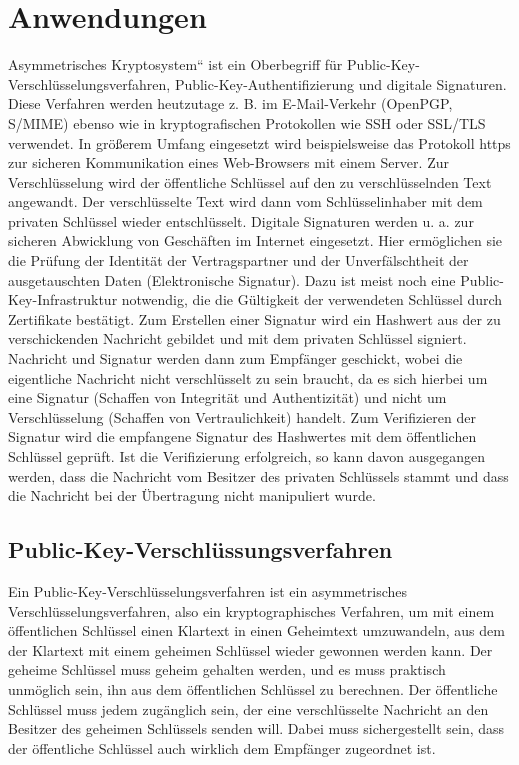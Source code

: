 \chapter{Anwendungen}
\label{chapter-anwendungen}
Asymmetrisches Kryptosystem“ ist ein Oberbegriff für Public-Key-Verschlüsselungsverfahren, Public-Key-Authentifizierung und digitale Signaturen. Diese Verfahren werden heutzutage z. B. im E-Mail-Verkehr (OpenPGP, S/MIME) ebenso wie in kryptografischen Protokollen wie SSH oder SSL/TLS verwendet. In größerem Umfang eingesetzt wird beispielsweise das Protokoll https zur sicheren Kommunikation eines Web-Browsers mit einem Server.
Zur Verschlüsselung wird der öffentliche Schlüssel auf den zu verschlüsselnden Text angewandt. Der verschlüsselte Text wird dann vom Schlüsselinhaber mit dem privaten Schlüssel wieder entschlüsselt.
Digitale Signaturen werden u. a. zur sicheren Abwicklung von Geschäften im Internet eingesetzt. Hier ermöglichen sie die Prüfung der Identität der Vertragspartner und der Unverfälschtheit der ausgetauschten Daten (Elektronische Signatur). Dazu ist meist noch eine Public-Key-Infrastruktur notwendig, die die Gültigkeit der verwendeten Schlüssel durch Zertifikate bestätigt.
Zum Erstellen einer Signatur wird ein Hashwert aus der zu verschickenden Nachricht gebildet und mit dem privaten Schlüssel signiert. Nachricht und Signatur werden dann zum Empfänger geschickt, wobei die eigentliche Nachricht nicht verschlüsselt zu sein braucht, da es sich hierbei um eine Signatur (Schaffen von Integrität und Authentizität) und nicht um Verschlüsselung (Schaffen von Vertraulichkeit) handelt.
Zum Verifizieren der Signatur wird die empfangene Signatur des Hashwertes mit dem öffentlichen Schlüssel geprüft. Ist die Verifizierung erfolgreich, so kann davon ausgegangen werden, dass die Nachricht vom Besitzer des privaten Schlüssels stammt und dass die Nachricht bei der Übertragung nicht manipuliert wurde.
\section{Public-Key-Verschlüssungsverfahren}
Ein Public-Key-Verschlüsselungsverfahren ist ein asymmetrisches Verschlüsselungsverfahren, also ein kryptographisches Verfahren, um mit einem öffentlichen Schlüssel einen Klartext in einen Geheimtext umzuwandeln, aus dem der Klartext mit einem geheimen Schlüssel wieder gewonnen werden kann.
Der geheime Schlüssel muss geheim gehalten werden, und es muss praktisch unmöglich sein, ihn aus dem öffentlichen Schlüssel zu berechnen. Der öffentliche Schlüssel muss jedem zugänglich sein, der eine verschlüsselte Nachricht an den Besitzer des geheimen Schlüssels senden will. Dabei muss sichergestellt sein, dass der öffentliche Schlüssel auch wirklich dem Empfänger zugeordnet ist.
